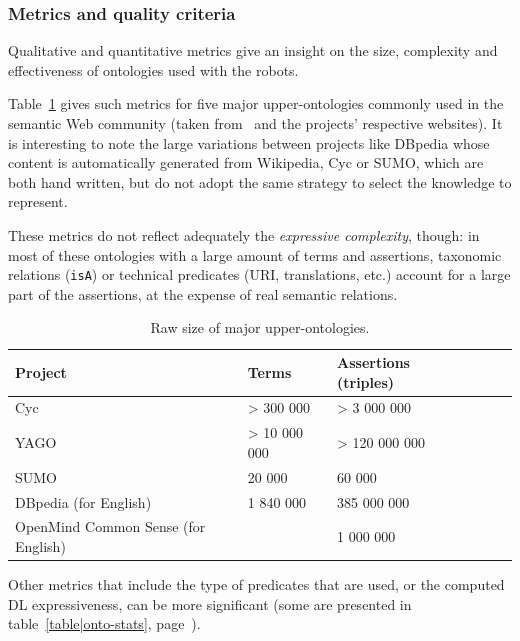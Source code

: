 \documentclass[a4paper, twocolumn]{article}
\newcommand{\concept}[1]{{\footnotesize \texttt{#1}}}
\begin{document}
\subsubsection{Metrics and quality criteria}

Qualitative and quantitative metrics give an insight on the size, complexity
and effectiveness of ontologies used with the robots.

Table~\ref{table|upper_onto_metrics} gives such metrics for five major
upper-ontologies commonly used in the semantic Web community (taken
from~\cite{Mascardi2007} and the projects' respective websites). It is
interesting to note the large variations between projects like {\sc DBpedia}
whose content is automatically generated from Wikipedia, {\sc Cyc} or {\sc
SUMO}, which are both hand written, but do not adopt the same strategy to
select the knowledge to represent.

These metrics do not reflect adequately the \emph{expressive complexity},
though: in most of these ontologies with a large amount of terms and
assertions, taxonomic relations (\concept{isA}) or technical predicates (URI,
translations, etc.) account for a large part of the assertions, at the expense
of real semantic relations.

\begin{table}
\begin{center}

\begin{tabular}{llllll}
\toprule
{\bf Project} & {\bf Terms} & {\bf Assertions} (triples) \\
\midrule
{\sc Cyc} & > 300 000 & > 3 000 000 & \\
YAGO & > 10 000 000 & > 120 000 000 \\
SUMO & 20 000 & 60 000 \\
{\sc DBpedia} (for English) & 1 840 000 & 385 000 000\\
{\sc OpenMind} Common Sense (for English) & & 1 000 000\\
\bottomrule

\end{tabular}
\end{center}
\caption{Raw size of major upper-ontologies.}
\label{table|upper_onto_metrics}
\end{table}

Other metrics that include the type of predicates that are used, or the
computed DL expressiveness, can be more significant (some are presented in
table~\ref{table|onto-stats}, page~\pageref{table|onto-stats}).
\end{document}
